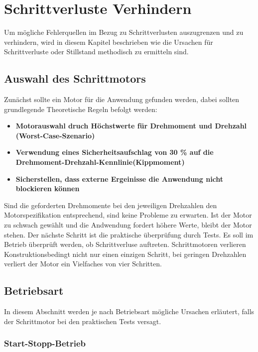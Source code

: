 %

\chapter{Schrittverluste Verhindern}
Um mögliche Fehlerquellen im Bezug zu Schrittverlusten auszugrenzen und zu verhindern, wird in diesem Kapitel beschrieben wie die Ursachen für Schrittverluste oder Stillstand methodisch zu ermitteln sind. 

\section{Auswahl des Schrittmotors}
Zunächst sollte ein Motor für die Anwendung gefunden werden, dabei sollten grundlegende Theoretische Regeln befolgt werden:
\begin{itemize}
	\item {\textbf{Motorauswahl druch Höchstwerte für Drehmoment und Drehzahl (Worst-Case-Szenario)}}
	\item {\textbf{Verwendung eines Sicherheitsaufschlag von 30 \% auf die Drehmoment-Drehzahl-Kennlinie(Kippmoment)}}
	\item {\textbf{Sicherstellen, dass externe Ergeinisse die Anwendung nicht blockieren können}}
\end{itemize}

Sind die geforderten Drehmomente bei den jeweiligen Drehzahlen den Motorspezifikation entsprechend, sind keine Probleme zu erwarten. Ist der Motor zu schwach gewählt und die Andwendung fordert höhere Werte, bleibt der Motor stehen. 
Der nächste Schritt ist die praktische überprüfung durch Tests. Es soll im Betrieb überprüft werden, ob Schrittverluse auftreten. Schrittmotoren verlieren Konstruktionsbedingt nicht nur einen einzigen Schritt, bei geringen Drehzahlen verliert der Motor ein Vielfaches von vier Schritten.


\section{Betriebsart}

In diesem Abschnitt werden je nach Betriebsart mögliche Ursachen erläutert, falls der Schrittmotor bei den praktischen Tests versagt.

\subsection{Start-Stopp-Betrieb}

